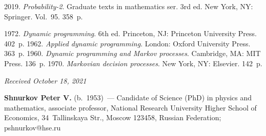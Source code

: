 \begin{multicols}{2}
{{\begin{thebibliography}{99}
{}

\columnbreak

 2019. \textit{Probability-2}. Graduate texts in mathematics ser. 
3rd ed. New York, NY: Springer. 
Vol.~95. 358~p. 



 1972. \textit{Dynamic programming}. 6th ed. Princeton, NJ: Princeton University Press. 
402~p.
 1962. \textit{Applied dynamic programming}. London: Oxford University 
Press. 363~p.
 1960. \textit{Dynamic programming and Markov processes}. Cambridge, MA: MIT 
Press. 136~p.
 1970. \textit{Markovian decision processes}. New York, NY: Elsevier. 142~p.
\end{thebibliography}

 }
 }

\end{multicols}

\vspace*{-3pt}

\hfill{\small\textit{Received October 18, 2021}}




\Contrl

\noindent
\textbf{Shnurkov Peter V.} (b.\ 1953)~--- Candidate of Science (PhD) in physics and mathematics, associate 
professor, National Research University Higher School of Economics, 34~Tallinskaya Str., Moscow 123458, 
Russian Federation; \mbox{pshnurkov@hse.ru}


\label{end\stat}

\renewcommand{\bibname}{\protect\rm Литература} 
      